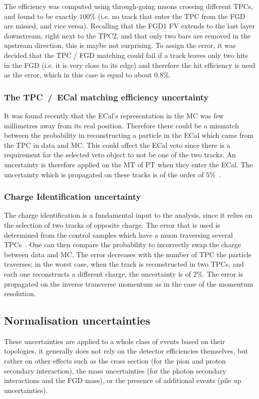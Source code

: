 The efficiency was computed using through-going muons crossing
different \Glspl{TPC}, and found to be exactly $100\%$ (i.e. no track
that enter the \Gls{TPC} from the \Gls{FGD} are missed, and vice
versa). Recalling that the \Gls{FGD}1 \Gls{FV} extends to the last
layer downstream, right next to the \Gls{TPC}2, and that only two bars
are removed in the upstream direction, this is maybe not
surprising. To assign the error, it was decided that the \Gls{TPC} /
\Gls{FGD} matching could fail if a track leaves only two hits in the
\Gls{FGD} (i.e. it is very close to its edge) and therefore the hit
efficiency is used as the error, which in this case is equal to about
$0.8\%$.

\subsubsection{The \Gls{TPC}~/~\Gls{ECal} matching efficiency uncertainty}
\label{subsubsec:tpcecalmatch}
It was found recently that the \Gls{ECal}'s representation in the
\Gls{MC} was few millimetres away from its real position. Therefore
there could be a mismatch between the probability in reconstructing a
particle in the \Gls{ECal} which came from the \Gls{TPC} in data and
\Gls{MC}. This could affect the \Gls{ECal} veto since there is a
requirement for the selected veto object to not be one of the two
tracks. An uncertainty is therefore applied on the \Gls{MT} of
\Gls{PT} when they enter the \Gls{ECal}. The uncertainty which is
propagated on these tracks is of the order of $5\%$~\cite{TN279}.

\subsubsection{Charge Identification uncertainty}
\label{subsubsec:chargeid}
The charge identification is a fundamental input to the analysis,
since it relies on the selection of two tracks of opposite charge.
The error that is used is determined from the control samples which
have a muon traversing several \Glspl{TPC}~\cite{TN212}. One can then
compare the probability to incorrectly swap the charge between data
and \Gls{MC}. The error decreases with the number of \Gls{TPC} the
particle traverses; in the worst case, when the track is reconstructed
in two \Glspl{TPC}, and each one reconstructs a different charge, the
uncertainty is of $2\%$.  The error is propagated on the inverse
transverse momentum as in the case of the momentum resolution.

\subsection{Normalisation uncertainties}
These uncertainties are applied to a whole class of events based on
their topologies, it generally does not rely on the detector
efficiencies themselves, but rather on other effects such as the cross
section (for the pion and proton secondary interaction), the mass
uncertainties (for the photon secondary interactions and the \Gls{FGD}
mass), or the presence of additional events (pile up uncertainties).

